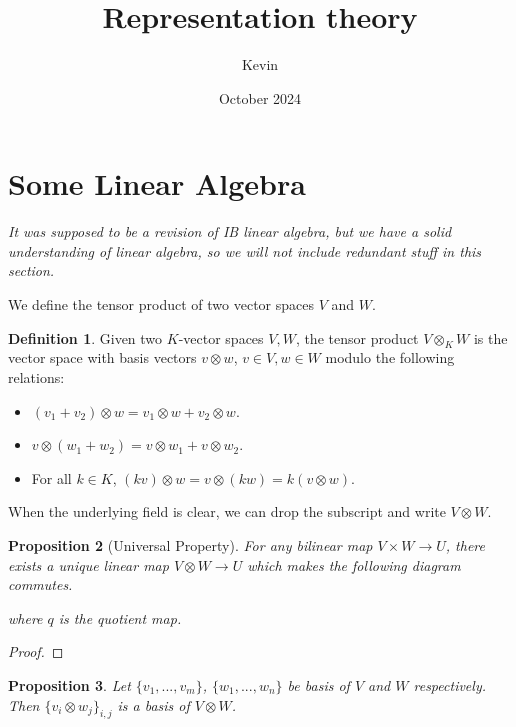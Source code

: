 \documentclass{article}
\title{Representation theory}
\author{Kevin}
\date{October 2024}
\theoremstyle{definition}
\newtheorem{defn}{Definition}[section]
\theoremstyle{remark}
\theoremstyle{plain}
\newtheorem{prop}[defn]{Proposition}
\begin{document}
\maketitle
\section{Some Linear Algebra}
\textit{It was supposed to be a revision of IB linear algebra, but we have a solid understanding of linear algebra, so we will not include redundant stuff in this section.}

We define the tensor product of two vector spaces $V$ and $W$. 
\begin{defn}
    Given two $K$-vector spaces $V,W$, the tensor product $V\otimes_K W$ is the vector space with basis vectors $v\otimes w$, $v\in V, w\in W$ modulo the following relations:
    \begin{itemize}
        \item $(v_1+v_2)\otimes w=v_1\otimes w+ v_2\otimes w$.
        \item $v\otimes (w_1+w_2)=v\otimes w_1+v\otimes w_2$.
        \item For all $k\in K$, $(kv)\otimes w=v\otimes (kw)=k(v\otimes w)$.
    \end{itemize}
\end{defn}
When the underlying field is clear, we can drop the subscript and write $V\otimes W$.
\begin{prop}[Universal Property]
    For any bilinear map $V\times W\to U$, there exists a unique linear map $V\otimes W\to U$ which makes the following diagram commutes.
    \begin{center}
    \end{center} where $q$ is the quotient map.
\end{prop}
\begin{proof}
    
\end{proof}
\begin{prop}
    Let $\{v_1,...,v_m\}$, $\{w_1,...,w_n\}$ be basis of $V$ and $W$ respectively. Then $\{v_i\otimes w_j\}_{i,j}$ is a basis of $V\otimes W$.
\end{prop}
\end{document}
